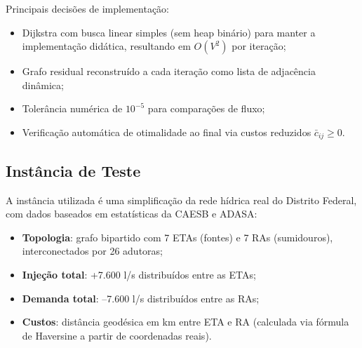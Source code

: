 Principais decisões de implementação:

\begin{itemize}
  \item Dijkstra com busca linear simples (sem heap binário) para manter a implementação didática, resultando em $O(V^2)$ por iteração;
  \item Grafo residual reconstruído a cada iteração como lista de adjacência dinâmica;
  \item Tolerância numérica de $10^{-5}$ para comparações de fluxo;
  \item Verificação automática de otimalidade ao final via custos reduzidos $\bar{c}_{ij} \geq 0$.
\end{itemize}


\subsection{Instância de Teste}

A instância utilizada é uma simplificação da rede hídrica real do Distrito Federal, com dados baseados em estatísticas da CAESB e ADASA:

\begin{itemize}
  \item \textbf{Topologia}: grafo bipartido com 7 ETAs (fontes) e 7 RAs (sumidouros), interconectados por 26 adutoras;
  \item \textbf{Injeção total}: +7.600 l/s distribuídos entre as ETAs;
  \item \textbf{Demanda total}: --7.600 l/s distribuídos entre as RAs;
  \item \textbf{Custos}: distância geodésica em km entre ETA e RA (calculada via fórmula de Haversine a partir de coordenadas reais).
\end{itemize}

